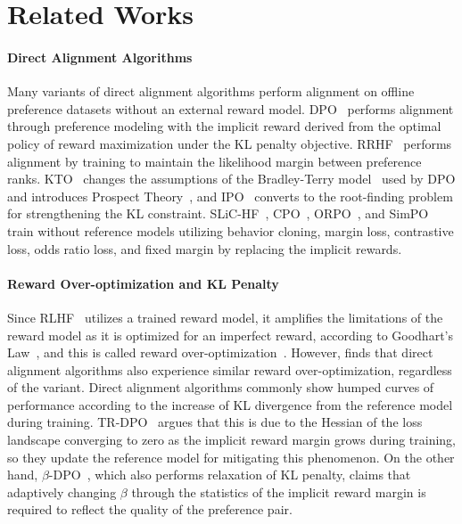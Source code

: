 \section{Related Works}

\paragraph{Direct Alignment Algorithms} 
Many variants of direct alignment algorithms perform alignment on offline preference datasets without an external reward model. DPO~\cite{rafailov2023direct} performs alignment through preference modeling with the implicit reward derived from the optimal policy of reward maximization under the KL penalty objective. RRHF~\cite{yuan2023rrhf} performs alignment by training to maintain the likelihood margin between preference ranks. KTO~\cite{ethayarajh2024kto} changes the assumptions of the Bradley-Terry model~\cite{bradley1952rank} used by DPO and introduces Prospect Theory~\cite{kahneman2013prospect}, and IPO~\cite{azar2024general} converts to the root-finding problem for strengthening the KL constraint. SLiC-HF~\cite{zhao2023slic}, CPO~\cite{xu2024contrastive}, ORPO~\cite{hong2024orpo}, and SimPO~\cite{meng2024simpo} train without reference models utilizing behavior cloning, margin loss, contrastive loss, odds ratio loss, and fixed margin by replacing the implicit rewards.

\paragraph{Reward Over-optimization and KL Penalty}
Since RLHF~\cite{ziegler2020finetuning} utilizes a trained reward model, it amplifies the limitations of the reward model as it is optimized for an imperfect reward, according to Goodhart’s Law~\cite{hoskin1996awful}, and this is called reward over-optimization~\cite{gao2023scaling}. However, \citet{rafailov2024scaling} finds that direct alignment algorithms also experience similar reward over-optimization, regardless of the variant. Direct alignment algorithms commonly show humped curves of performance according to the increase of KL divergence from the reference model during training. TR-DPO~\cite{gorbatovski2024learn} argues that this is due to the Hessian of the loss landscape converging to zero as the implicit reward margin grows during training, so they update the reference model for mitigating this phenomenon. On the other hand, $\beta$-DPO~\cite{wu2024beta}, which also performs relaxation of KL penalty, claims that adaptively changing $\beta$ through the statistics of the implicit reward margin is required to reflect the quality of the preference pair.

